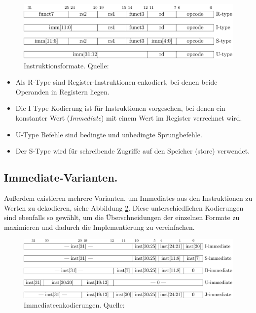 \begin{figure} [ht]
  \centering
  \includegraphics[width=\textwidth]{Figures/instruction_formats}
  \caption{Instruktionsformate. Quelle: \citep[S. 11]{RISC}}
  \label{fig:instr_types}
\end{figure}


\begin{itemize}  
\item Als R-Type sind Register-Instruktionen enkodiert, bei denen beide Operanden in Registern liegen. 
\item Die I-Type-Kodierung ist für Instruktionen vorgesehen, bei denen ein konstanter Wert (\textit{Immediate}) mit einem Wert im Register verrechnet wird.
\item U-Type Befehle sind bedingte und unbedingte Sprungbefehle.
\item Der S-Type wird für schreibende Zugriffe auf den Speicher (store) verwendet. 
\end{itemize}

\subsection{Immediate-Varianten.} Außerdem existieren mehrere Varianten, um Immediates aus den Instruktionen zu Werten zu dekodieren, siehe Abbildung \ref{fig:immediates}. Diese unterschiedlichen Kodierungen sind ebenfalls so gewählt, um die Überschneidungen der einzelnen Formate zu maximieren und dadurch die Implementierung zu vereinfachen. \cite[S. 11f.]{RISC} 

\begin{figure} [ht]
  \centering
  \includegraphics[width=\textwidth]{Figures/immediates}
  \caption{Immediateenkodierungen. Quelle: \citep[S. 12]{RISC}}
  \label{fig:immediates}
\end{figure}

